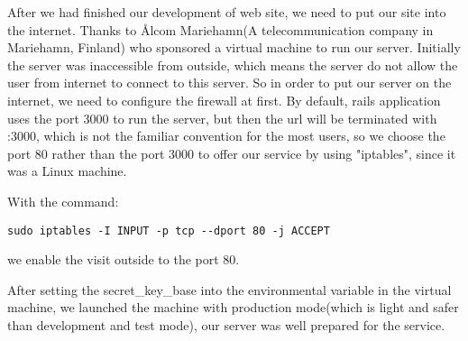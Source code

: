 After we had finished our development of web site, we need to put our site into the internet. Thanks to Ålcom Mariehamn(A telecommunication company in Mariehamn, Finland) who sponsored a virtual machine to run our server. Initially the server was inaccessible from outside, which means the server do not allow the user from internet to connect to this server. So in order to put our server on the internet, we need to configure the firewall at first. By default, rails application uses the port 3000 to run the server, but then the url will be terminated with :3000, which is not the familiar convention for the most users, so we choose the port 80 rather than the port 3000 to offer our service by using "iptables", since it was a Linux machine. 

With the command:
\begin{lstlisting}
sudo iptables -I INPUT -p tcp --dport 80 -j ACCEPT
\end{lstlisting}
we enable the visit outside to the port 80.

After setting the secret\_key\_base into the environmental variable in the virtual machine, we launched the machine with production mode(which is light and safer than development and test mode), our server was well prepared for the service.